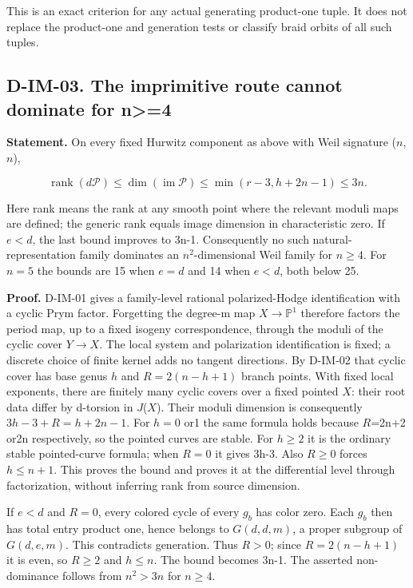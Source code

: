 This is an exact criterion for any actual generating product-one tuple. It does not replace the product-one and generation tests or classify braid orbits of all such tuples.

\subsection{D-IM-03. The imprimitive route cannot dominate for n\textgreater{}=4}
\label{D-IM-03}

\textbf{Statement.} On every fixed Hurwitz component as above with Weil signature (\(n\),\(n\)),

\[
\operatorname{rank}(d\mathcal P)\leq\dim(\operatorname{im}\mathcal P)\leq\min(r-3,h+2n-1)\leq3n.
\]

Here rank means the rank at any smooth point where the relevant moduli maps are defined; the generic rank equals image dimension in characteristic zero. If \(e< d\), the last bound improves to 3n-1. Consequently no such natural-representation family dominates an \(n^2\text{-dimensional}\) Weil family for \(n\geq 4\). For \(n= 5\) the bounds are 15 when \(e= d\) and 14 when \(e< d\), both below 25.

\textbf{Proof.} D-IM-01 gives a family-level rational polarized-Hodge identification with a cyclic Prym factor. Forgetting the degree-m map \(X\to\mathbb P^1\) therefore factors the period map, up to a fixed isogeny correspondence, through the moduli of the cyclic cover \(Y\to X\). The local system and polarization identification is fixed; a discrete choice of finite kernel adds no tangent directions. By D-IM-02 that cyclic cover has base genus \(h\) and \(R=2(n-h+1)\) branch points. With fixed local exponents, there are finitely many cyclic covers over a fixed pointed \(X\): their root data differ by d-torsion in \(J\)(\(X\)). Their moduli dimension is consequently \(3h-3+R=h+2n-1\). For \(h= 0\) or1 the same formula holds because \(R\)=2n+2 or2n respectively, so the pointed curves are stable. For \(h\geq 2\) it is the ordinary stable pointed-curve formula; when \(R= 0\) it gives 3h-3. Also \(R\geq 0\) forces \(h\leq n+1\). This proves the bound and proves it at the differential level through factorization, without inferring rank from source dimension.

If \(e< d\) and \(R= 0\), every colored cycle of every \(g_b\) has color zero. Each \(g_b\) then has total entry product one, hence belongs to \(G(d,d,m)\), a proper subgroup of \(G(d,e,m)\). This contradicts generation. Thus \(R> 0\); since \(R=2(n-h+1)\) it is even, so \(R\geq 2\) and \(h\leq n\). The bound becomes 3n-1. The asserted non-dominance follows from \(n^2>3n\) for \(n\geq 4\).

